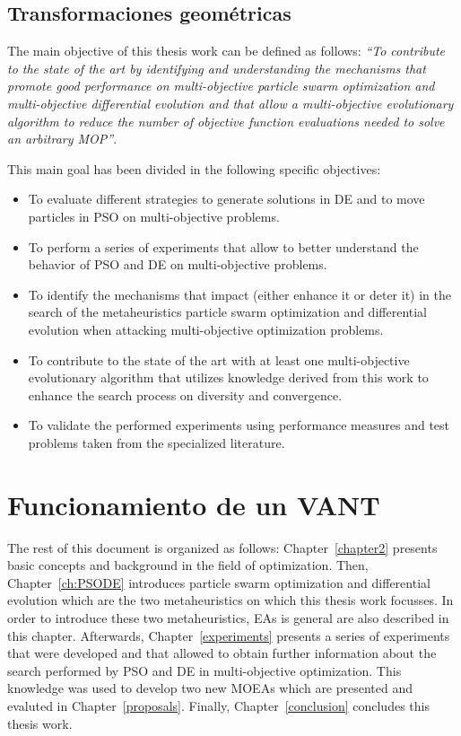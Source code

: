 \subsection{Transformaciones geométricas}

The main objective of this thesis work can be defined as follows: \emph{``To contribute to the state of the art by identifying and understanding the mechanisms that promote good performance on multi-objective particle swarm optimization and multi-objective differential evolution and that allow a multi-objective evolutionary algorithm to reduce the number of objective function evaluations needed to solve an arbitrary MOP''}. 

This main goal has been divided in the following specific objectives: 
\begin{itemize}\setlength{\itemsep}{-1mm}
	\item To evaluate different strategies to generate solutions in DE and to move particles in PSO on multi-objective problems.
	\item To perform a series of experiments that allow to better understand the behavior of PSO and DE on multi-objective problems.
	\item To identify the mechanisms that impact (either enhance it or deter it) in the search of the metaheuristics particle swarm optimization and differential evolution when attacking multi-objective optimization problems. 
	\item To contribute to the state of the art with at least one multi-objective evolutionary algorithm that utilizes knowledge derived from this work to enhance the search process on diversity and convergence. 
	\item To validate the performed experiments using performance measures and test problems taken from the specialized literature.
\end{itemize}


\section{Funcionamiento de un VANT}

The rest of this document is organized as follows: Chapter~\ref{chapter2} presents basic concepts and background in the field of optimization. Then, Chapter~\ref{ch:PSODE} introduces particle swarm optimization and differential evolution which are the two metaheuristics on which this thesis work focusses. In order to introduce these two metaheuristics, EAs is general are also described in this chapter. Afterwards, Chapter~\ref{experiments} presents a series of experiments that were developed and that allowed to obtain further information about the search performed by PSO and DE in multi-objective optimization. This knowledge was used to develop two new MOEAs which are presented and evaluted in Chapter~\ref{proposals}. Finally, Chapter~\ref{conclusion} concludes this thesis work.

